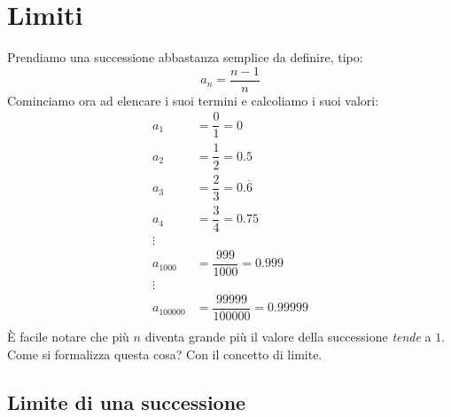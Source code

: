 \section{Limiti} \label{sec_limiti}
Prendiamo una successione abbastanza semplice da definire, tipo:
\begin{equation*}
    a_n = \frac{n-1}{n}
\end{equation*}
Cominciamo ora ad elencare i suoi termini e calcoliamo i suoi valori:
\begin{align*}
    a_1 &= \dfrac{0}{1} = 0\\
    a_2 &= \dfrac{1}{2} = 0.5\\
    a_3 &= \dfrac{2}{3} = 0.\overline{6}\\
    a_4 &= \dfrac{3}{4} = 0.75\\
    \vdots\\
    a_{1000} &= \dfrac{999}{1000} = 0.999\\
    \vdots\\
    a_{100000} &= \dfrac{99999}{100000} = 0.99999\\
\end{align*}
È facile notare che più $n$ diventa grande più il valore della successione \textit{tende} a $1$. Come si formalizza questa cosa? Con il concetto di limite.

\subsection{Limite di una successione} \label{sec_lim_successioni}

